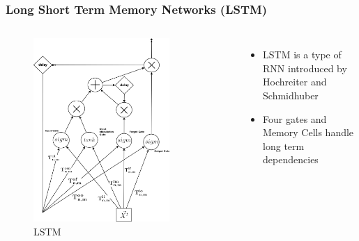 \documentclass{beamer}
\begin{document}
\begin{frame}
\frametitle{Long Short Term Memory Networks (LSTM)}
\begin{columns}
\begin{figure}[t!]
    \centering
    \includegraphics[width=0.8\textwidth]{../paper/pictures/figures/LSTM.png}
    \caption{LSTM}
    \label{fig:LSTM}
\end{figure}

\begin{itemize}
\item LSTM is a type of RNN introduced by Hochreiter and Schmidhuber \cite{hochreiter1997long}
\item Four gates and Memory Cells handle long term dependencies
\end{itemize}
\end{columns}
\end{frame}
\end{document}
